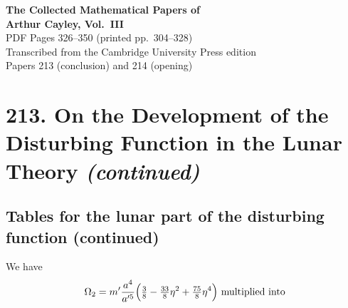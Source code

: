 \documentclass[12pt,a4paper]{article}
\theoremstyle{plain}
\begin{document}
\begin{center}
{\Large\bfseries The Collected Mathematical Papers of\\[0.5em] Arthur Cayley, Vol.~III}\\[2em]
{\large PDF Pages 326--350 (printed pp.~304--328)}\\[1em]
{\normalsize Transcribed from the Cambridge University Press edition}\\[0.5em]
{\small Papers 213 (conclusion) and 214 (opening)}
\end{center}

\vspace{2em}

\tableofcontents
\newpage


\section*{213. On the Development of the Disturbing Function in the Lunar Theory \textit{(continued)}}

\subsection*{Tables for the lunar part of the disturbing function (continued)}

 We have
\[
\Omega_{2}=m'\frac{a^{4}}{a'^{5}}\Bigl(\tfrac{3}{8}-\tfrac{33}{8}\eta^{2}+\tfrac{75}{8}\eta^{4}\Bigr)\ \text{multiplied into}
\]
\end{document}

